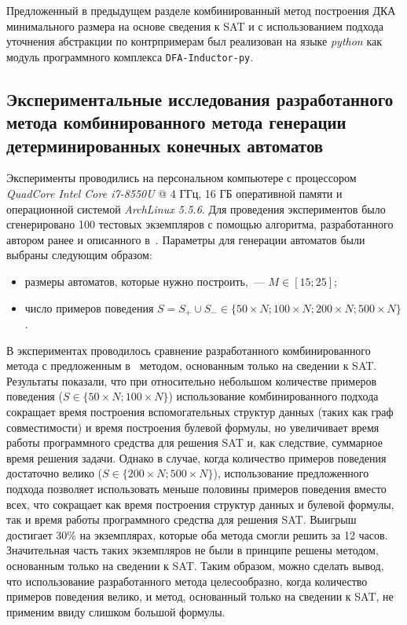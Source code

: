 Предложенный в предыдущем разделе комбинированный метод построения ДКА минимального размера на основе сведения к SAT и с использованием подхода уточнения абстракции по контрпримерам был реализован на языке \emph{python} как модуль программного комплекса \texttt{DFA-Inductor-py}.


\subsection{Экспериментальные исследования разработанного метода комбинированного метода генерации детерминированных конечных автоматов}
\label{sec:cegar:results:cegar}

Эксперименты проводились на персональном компьютере с процессором \emph{QuadCore Intel Core i7-8550U} @ 4 ГГц, 16 ГБ оперативной памяти и операционной системой \emph{ArchLinux 5.5.6}. Для проведения экспериментов было сгенерировано 100 тестовых экземпляров с помощью алгоритма, разработанного автором ранее и описанного в~\cite{zakirzyanov2017DataMode}.
Параметры для генерации автоматов были выбраны следующим образом:
\begin{itemize}
  \item размеры автоматов, которые нужно построить,~--- $M \in \left[15; 25\right]$;
  \item число примеров поведения $S = S_{+} \cup S_{-} \in \{50 \times N; 100 \times N; 200 \times N; 500 \times N\}$.
\end{itemize}
В экспериментах проводилось сравнение разработанного комбинированного метода с предложенным в~\cite{zakirzyanov2019LATA} методом, основанным только на сведении к SAT.
Результаты показали, что при относительно небольшом количестве примеров поведения ($S \in \{50 \times N; 100 \times N\}$) использование комбинированного подхода сокращает время построения вспомогательных структур данных (таких как граф совместимости) и время построения булевой формулы, но увеличивает время работы программного средства для решения SAT и, как следствие, суммарное время решения задачи.
Однако в случае, когда количество примеров поведения достаточно велико ($S \in \{200 \times N; 500 \times N\}$), использование предложенного подхода позволяет использовать меньше половины примеров поведения вместо всех, что сокращает как время построения структур данных и булевой формулы, так и время работы программного средства для решения SAT.
Выигрыш достигает $30 \%$ на экземплярах, которые оба метода смогли решить за 12 часов.
Значительная часть таких экземпляров не были в принципе решены методом, основанным только на сведении к SAT.
Таким образом, можно сделать вывод, что использование разработанного метода целесообразно, когда количество примеров поведения велико, и метод, основанный только на сведении к SAT, не применим ввиду слишком большой формулы.


\chresults{\ref{sec:cegar}}
